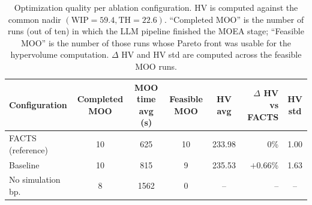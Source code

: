 \documentclass[a4paper,fleqn]{cas-sc}
\begin{document}
  \begin{table}[]                                                                                                                       
  \centering                                                                                                                                
  \caption{Optimization quality per ablation configuration. HV is computed                                                                  
  against the common nadir $(\mathrm{WIP}=59.4, \mathrm{TH}=22.6)$.                                                                         
  ``Completed MOO'' is the number of runs (out of ten) in which the LLM                                                                     
  pipeline finished the MOEA stage; ``Feasible MOO'' is the number of those                                                                 
  runs whose Pareto front was usable for the hypervolume computation.                                                                       
  $\Delta$ HV and HV std are computed across the feasible MOO runs.}                                                                        
  \label{tab:ablation_difference}                                                                                                           
  \begin{tabular}{@{}l c c c c r c@{}}                                                                                                      
  \toprule                                                                                                                                  
  \textbf{Configuration} & \textbf{Completed MOO} & \textbf{MOO time avg (s)} & \textbf{Feasible MOO} & \textbf{HV avg} & \textbf{$\Delta$  
  HV vs FACTS} & \textbf{HV std} \\                                                                                                         
  \midrule                                                                                                                                  
  FACTS (reference)     & 10 & 625   & 10 & 233.98 & $0$\%       & 1.00 \\                                                                  
  Baseline              & 10 & 815   & 9  & 235.53 & $+0.66$\%   & 1.63 \\                                                                  
  No simulation bp.     & 8  & 1562  & 0  & --     & --          & --   \\                                                                  

\end{tabular}
\end{table}
\end{document}
